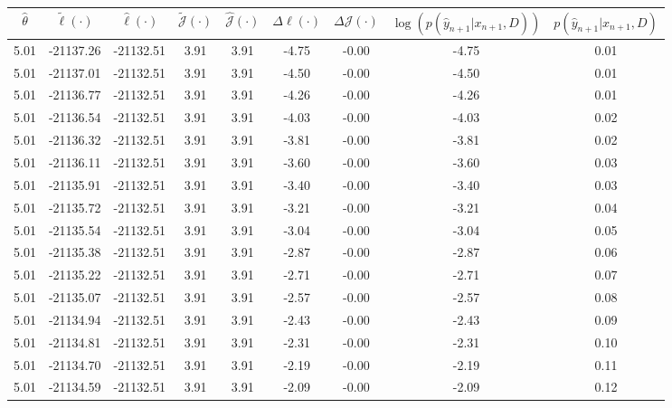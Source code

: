 \begin{table}[htbp]
        \centering
        \tiny
        \begin{adjustbox}{angle=90}
            \begin{tabular}{|c|c|c|c|c|c|c|c|c|}
                \hline
                 $\hat{\theta}$ & $\tilde{\ell}(\cdot)$ & $\hat{\ell}(\cdot)$ & $\tilde{\mathcal{J}}(\cdot)$ & $\hat{\mathcal{J}}(\cdot)$ & $\Delta \ell(\cdot)$ & $\Delta \mathcal{J}(\cdot)$ & $\log(p(\hat{y}_{n+1}|x_{n+1}, D))$ & $p(\hat{y}_{n+1}|x_{n+1}, D)$ \\
                \hline
                 5.01 & -21137.26 & -21132.51 & 3.91 & 3.91 & -4.75 & -0.00 & -4.75 & 0.01\\ \hline
 5.01 & -21137.01 & -21132.51 & 3.91 & 3.91 & -4.50 & -0.00 & -4.50 & 0.01\\ \hline
 5.01 & -21136.77 & -21132.51 & 3.91 & 3.91 & -4.26 & -0.00 & -4.26 & 0.01\\ \hline
 5.01 & -21136.54 & -21132.51 & 3.91 & 3.91 & -4.03 & -0.00 & -4.03 & 0.02\\ \hline
 5.01 & -21136.32 & -21132.51 & 3.91 & 3.91 & -3.81 & -0.00 & -3.81 & 0.02\\ \hline
 5.01 & -21136.11 & -21132.51 & 3.91 & 3.91 & -3.60 & -0.00 & -3.60 & 0.03\\ \hline
 5.01 & -21135.91 & -21132.51 & 3.91 & 3.91 & -3.40 & -0.00 & -3.40 & 0.03\\ \hline
 5.01 & -21135.72 & -21132.51 & 3.91 & 3.91 & -3.21 & -0.00 & -3.21 & 0.04\\ \hline
 5.01 & -21135.54 & -21132.51 & 3.91 & 3.91 & -3.04 & -0.00 & -3.04 & 0.05\\ \hline
 5.01 & -21135.38 & -21132.51 & 3.91 & 3.91 & -2.87 & -0.00 & -2.87 & 0.06\\ \hline
 5.01 & -21135.22 & -21132.51 & 3.91 & 3.91 & -2.71 & -0.00 & -2.71 & 0.07\\ \hline
 5.01 & -21135.07 & -21132.51 & 3.91 & 3.91 & -2.57 & -0.00 & -2.57 & 0.08\\ \hline
 5.01 & -21134.94 & -21132.51 & 3.91 & 3.91 & -2.43 & -0.00 & -2.43 & 0.09\\ \hline
 5.01 & -21134.81 & -21132.51 & 3.91 & 3.91 & -2.31 & -0.00 & -2.31 & 0.10\\ \hline
 5.01 & -21134.70 & -21132.51 & 3.91 & 3.91 & -2.19 & -0.00 & -2.19 & 0.11\\ \hline
 5.01 & -21134.59 & -21132.51 & 3.91 & 3.91 & -2.09 & -0.00 & -2.09 & 0.12\\ \hline

\end{tabular}
\end{adjustbox}
\end{table}
